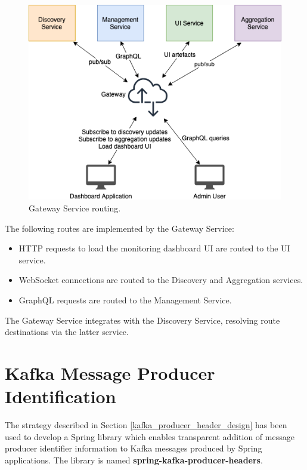  \vspace{5mm}
 
 \begin{figure}[H]
 	\centering  
 	\includegraphics[scale=0.8]{figures/impl/gateway/gateway.png}
 	\caption{Gateway Service routing.}
 	\label{gatway_service}
 \end{figure}

 The following routes are implemented by the Gateway Service:
 
  \begin{itemize}
 	\item HTTP requests to load the monitoring dashboard UI are routed to the UI service.
 	\item WebSocket connections are routed to the Discovery and Aggregation services.
 	\item GraphQL requests are routed to the Management Service.
 \end{itemize}

The Gateway Service integrates with the Discovery Service, resolving route destinations via the latter service.
 
 \newpage
 
 \section{Kafka Message Producer Identification}\label{software_impl_producer_ident} 
 
 The strategy described in Section \ref{kafka_producer_header_design} has been used to develop a Spring library which enables transparent addition of message producer identifier information to Kafka messages produced by Spring applications. The library is named \textbf{spring-kafka-producer-headers}.
 
